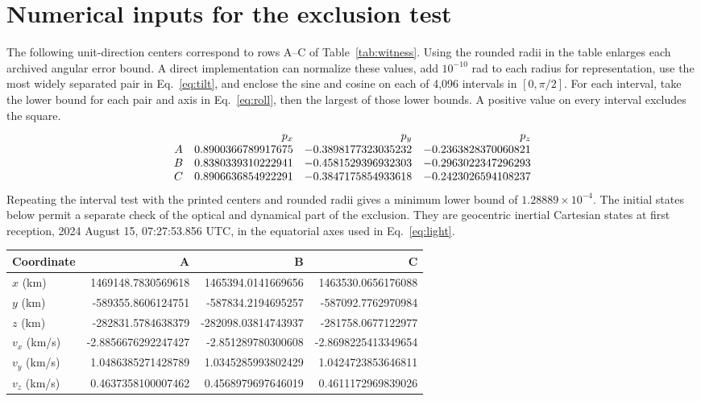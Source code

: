 \documentclass[10pt,letterpaper]{article}
\begin{document}
\section{Numerical inputs for the exclusion test}\label{app:replay}
The following unit-direction centers correspond to rows A--C of Table~\ref{tab:witness}. Using the rounded radii in the table enlarges each archived angular error bound. A direct implementation can normalize these values, add $10^{-10}$ rad to each radius for representation, use the most widely separated pair in Eq.~\eqref{eq:tilt}, and enclose the sine and cosine on each of 4,096 intervals in $[0,\pi/2]$. For each interval, take the lower bound for each pair and axis in Eq.~\eqref{eq:roll}, then the largest of those lower bounds. A positive value on every interval excludes the square.
\[
\begin{array}{c@{\quad}rrr}
 & p_x & p_y & p_z\\
 A & 0.8900366789917675 & -0.3898177323035232 & -0.2363828370060821\\
 B & 0.8380339310222941 & -0.4581529396932303 & -0.2963022347296293\\
 C & 0.8906636854922291 & -0.3847175854933618 & -0.2423026594108237
\end{array}
\]
Repeating the interval test with the printed centers and rounded radii gives a minimum lower bound of $1.28889\times10^{-4}$. The initial states below permit a separate check of the optical and dynamical part of the exclusion. They are geocentric inertial Cartesian states at first reception, 2024 August 15, 07:27:53.856 UTC, in the equatorial axes used in Eq.~\eqref{eq:light}.
\begin{center}
\begin{tabular}{lrrr}
\toprule
Coordinate & A & B & C\\
\midrule
$x$ (km) & 1469148.7830569618 & 1465394.0141669656 & 1463530.0656176088\\
$y$ (km) & -589355.8606124751 & -587834.2194695257 & -587092.7762970984\\
$z$ (km) & -282831.5784638379 & -282098.03814743937 & -281758.0677122977\\
$v_x$ (km/s) & -2.8856676292247427 & -2.851289780300608 & -2.8698225413349654\\
$v_y$ (km/s) & 1.0486385271428789 & 1.0345285993802429 & 1.0424723853646811\\
$v_z$ (km/s) & 0.4637358100007462 & 0.4568979697646019 & 0.4611172969839026\\
\bottomrule
\end{tabular}
\end{center}
\end{document}
